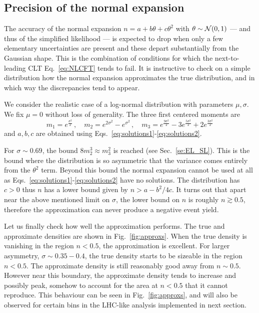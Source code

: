 \documentclass[11pt]{article}
\newcommand{\be}{\begin{equation}}
\newcommand{\ee}{\end{equation}}
\begin{document}
\subsection{Precision of the normal expansion}

The accuracy of the normal expansion $n =  a+ b \theta+ c \theta^2$ with $\theta\sim {\cal N}(0,1)$ --- and thus of the  simplified likelihood --- is expected to drop when only a few elementary  uncertainties are present and these depart substantially from the Gaussian shape. This is the combination of conditions for which the
 next-to-leading CLT Eq.~\eqref{eq:NLCFT} tends to fail.  It is instructive to check  on a simple distribution how the normal expansion  approximates the true distribution, and in which way the discrepancies tend to appear.

We consider the realistic  case of     a log-normal distribution with parameters $\mu, \sigma$. We fix $\mu=0$ without loss of generality. The three first centered moments are
\be
m_1=e^{\frac{\sigma^2}{2}}\,,\quad m_2=e^{2\sigma^2}-e^{\sigma^2}\,,\quad
m_3=e^{\frac{9\sigma^2}{2}}-3 e^{\frac{5\sigma^2}{2}}+2 e^{\frac{3\sigma^2}{2}}
\ee
and  $a,b,c$ are obtained  using  Eqs.~\eqref{eq:solutions1}-\eqref{eq:solutions2}.

For $\sigma\sim 0.69$, the bound $8m_2^3\approx m_3^2$  is reached (see Sec.~\ref{se:EL_SL}). This is the bound where
the distribution is so asymmetric that the variance comes entirely from the $\theta^2$ term. Beyond this bound the  normal expansion cannot be used at all as Eqs.~\eqref{eq:solutions1}-\eqref{eq:solutions2} have no solutions.
 The distribution has $c>0$ thus $n$ has a lower bound given by $n>a-b^2/4c$. It turns out that apart near the above mentioned limit on $\sigma$, the lower bound on $n$ is roughly $n\gtrsim 0.5$, therefore the approximation can never produce a negative event yield.

 Let us finally check how well the approximation performs. The true and approximate densities are shown in Fig.~\ref{fig:approxs}.   When the true density is vanishing in the region $n<0.5$, the approximation is excellent.  For larger asymmetry, $\sigma \sim 0.35-0.4$, the true density starts to be sizeable in the region $n<0.5$. The approximate density is still reasonably good away from $n\sim 0.5$. However near this boundary, the approximate density tends to increase and possibly peak, somehow to account for  the area at $n<0.5$ that it cannot reproduce.
 This behaviour can be seen in Fig.~\ref{fig:approxs}, and will also be observed for certain bins in the LHC-like analysis implemented in next section.
\end{document}

